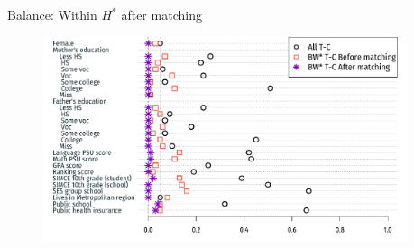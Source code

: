 \documentclass[usenames,dvipsnames,11pt,aspectratio=169]{beamer}
\begin{document}
\begin{frame}{Balance: Within $H^*$ after matching}
\begin{figure}[!htb]
\centering
    \includegraphics[width=0.95\textwidth]{figures/loveplot3.pdf}
\end{figure}
\end{frame}


\end{document}
